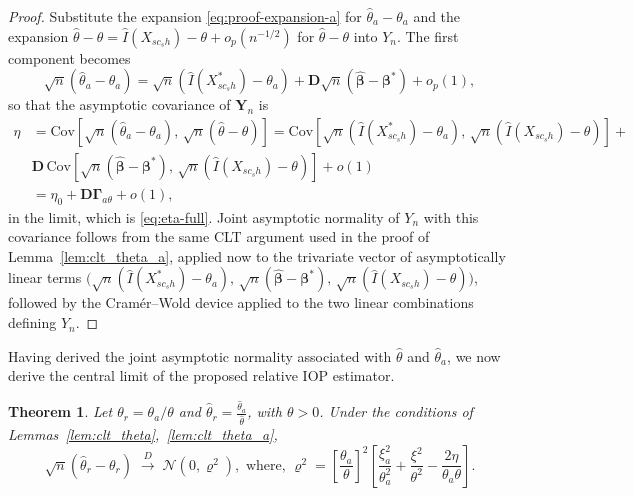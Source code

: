\documentclass[12pt]{article}
\theoremstyle{plain}
\newtheorem{theorem}{Theorem}
\theoremstyle{definition}
\begin{document}
\begin{proof}
Substitute the expansion \eqref{eq:proof-expansion-a} for $\hat\theta_a-\theta_a$ and the
expansion $\hat\theta-\theta=\hat I(X_{sc_sh})-\theta+o_p(n^{-1/2})$ for
$\hat\theta-\theta$ into $Y_n$. The first component becomes
\[
\sqrt n(\hat\theta_a-\theta_a) = \sqrt n\left(\hat I(X^*_{sc_sh})-\theta_a\right) + \mathbf D\sqrt n\left(\hat{\boldsymbol\beta}-\boldsymbol\beta^*\right) + o_p(1),
\]
so that the asymptotic covariance of $\mathbf{Y}_n$ is
\begin{align*}
\eta&=\mathrm{Cov}\!\left[\sqrt n(\hat\theta_a-\theta_a),\,\sqrt n(\hat\theta-\theta)\right]= \mathrm{Cov}\!\left[\sqrt n\left(\hat I(X^*_{sc_sh})-\theta_a\right),\,\sqrt n\left(\hat I(X_{sc_sh})-\theta\right)\right]+\\
& \mathbf D\,\mathrm{Cov}\!\left[\sqrt n\left(\hat{\boldsymbol\beta}-\boldsymbol\beta^*\right),\,\sqrt n\left(\hat I(X_{sc_sh})-\theta\right)\right] + o(1)\\
&= \eta_0 + \mathbf D\boldsymbol\Gamma_{a\theta} + o(1),
\end{align*}
in the limit, which is \eqref{eq:eta-full}. Joint asymptotic normality of $Y_n$ with this
covariance follows from the same CLT argument used in the proof of Lemma~\ref{lem:clt_theta_a}, applied now to the trivariate vector of asymptotically linear terms
$\big(\sqrt n(\hat I(X^*_{sc_sh})-\theta_a),\,\sqrt n(\hat{\boldsymbol\beta}-\boldsymbol\beta^*),\,\sqrt n(\hat I(X_{sc_sh})-\theta)\big)$,
followed by the Cramér--Wold device applied to the two linear combinations defining $Y_n$.
\end{proof}
Having derived the joint asymptotic normality associated with $\hat \theta$ and $\hat \theta_a$, we now derive the central limit of the proposed relative IOP estimator.
\begin{theorem}
\label{thm:clt_theta_r}
Let $\theta_r = {\theta_a}/{\theta}$ and $\hat{\theta}_r = \frac{\hat{\theta}_a}{\hat{\theta}}$, with \( \theta > 0 \). Under the conditions of Lemmas~\ref{lem:clt_theta},~\ref{lem:clt_theta_a},
\[
\sqrt{n}\left( \hat{\theta}_r - \theta_r \right)
\;\xrightarrow{D}\;
\mathcal{N}(0, \varrho^2),\text{ where, }\varrho^2
=\left[\frac{\theta_a}{\theta}\right]^2\left[\frac{\xi_a^2}{\theta_a^2} + \frac{\xi^2}{\theta^2} - \frac{2\eta}{\theta_a\theta}\right].
\]
\end{theorem}
\end{document}
